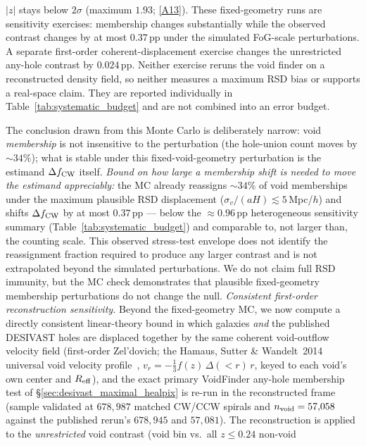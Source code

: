 \documentclass[aps,prd,twocolumn,superscriptaddress,showpacs,preprintnumbers,nofootinbib,longbibliography,floatfix]{revtex4-2}
\newcommand{\repoBase}{https://github.com/Hubify-Projects/bigbounce/blob/main}
\begin{document}
$|z|$ stays below $2\sigma$ (maximum $1.93$;
\href{\repoBase/pipelines/p5\_desi\_chirality/outputs/26\_r27conf\_ess\_recomputes.json}{[A13]}).
These fixed-geometry runs are sensitivity exercises: membership changes
substantially while the observed contrast changes by at most $0.37$\,pp
under the simulated FoG-scale perturbations. A separate first-order
coherent-displacement exercise changes the unrestricted any-hole
contrast by $0.024$\,pp. Neither exercise reruns the void finder on a
reconstructed density field, so neither measures a maximum RSD bias or
supports a real-space claim. They are reported individually in
Table~\ref{tab:systematic_budget} and are not combined into an error
budget.

\iffalse
The conclusion drawn from this Monte Carlo is deliberately narrow:
void \emph{membership} is not insensitive to the perturbation (the
hole-union count moves by ${\sim}34\%$); what is stable under this
fixed-void-geometry perturbation is the estimand $\Delta f_{\rm CW}$
itself. \emph{Bound on how large a membership shift is needed to move the
estimand appreciably:} the MC already reassigns ${\sim}34\%$ of
void memberships under the maximum plausible RSD displacement
($\sigma_v/(aH)\!\lesssim\!5$\,Mpc/$h$) and shifts $\Delta f_{\rm CW}$
by at most $0.37$\,pp --- below the
${\approx}0.96$\,pp heterogeneous sensitivity summary
(Table~\ref{tab:systematic_budget}) and comparable to, not larger than,
the counting scale. This observed stress-test envelope does not identify
the reassignment fraction required to produce any larger contrast and is
not extrapolated beyond the simulated perturbations. We do not claim full RSD immunity,
but the MC check demonstrates that plausible fixed-geometry membership
perturbations do not change the null. \emph{Consistent first-order
reconstruction sensitivity.} Beyond the
fixed-geometry MC, we now compute a directly consistent linear-theory
bound in which galaxies \emph{and} the published DESIVAST holes are
displaced together by the same coherent void-outflow velocity field
(first-order Zel'dovich; the Hamaus, Sutter \& Wandelt~2014
universal void velocity profile~\cite{Hamaus2014},
$v_r = -\tfrac{1}{3}f(z)\,\Delta(<r)\,r$, keyed to each void's own
center and $R_{\rm eff}$), and the exact primary VoidFinder any-hole
membership test of \S\ref{sec:desivast_maximal_healpix} is re-run in the
reconstructed frame (sample validated at $678{,}987$ matched CW/CCW
spirals and $n_{\rm void}=57{,}058$ against the published rerun's
$678{,}945$ and $57{,}081$). The reconstruction is applied to the
\emph{unrestricted} void contrast (void bin vs.\ all $z\le0.24$ non-void
\end{document}
